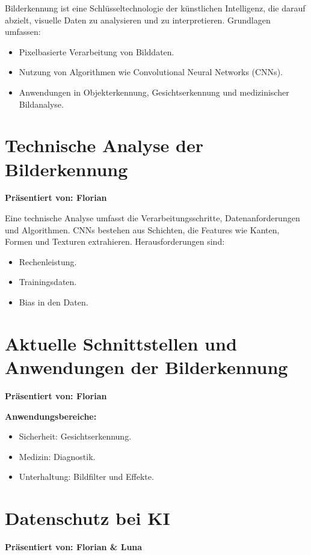 \documentclass[a4paper,12pt]{article}
\begin{document}
Bilderkennung ist eine Schlüsseltechnologie der künstlichen Intelligenz, die darauf abzielt, visuelle Daten zu analysieren und zu interpretieren. Grundlagen umfassen:
\begin{itemize}
    \item Pixelbasierte Verarbeitung von Bilddaten.
    \item Nutzung von Algorithmen wie Convolutional Neural Networks (CNNs).
    \item Anwendungen in Objekterkennung, Gesichtserkennung und medizinischer Bildanalyse.
\end{itemize}

\section{Technische Analyse der Bilderkennung}
\textbf{Präsentiert von: Florian}

Eine technische Analyse umfasst die Verarbeitungsschritte, Datenanforderungen und Algorithmen. CNNs bestehen aus Schichten, die Features wie Kanten, Formen und Texturen extrahieren. Herausforderungen sind:
\begin{itemize}
    \item Rechenleistung.
    \item Trainingsdaten.
    \item Bias in den Daten.
\end{itemize}

\section{Aktuelle Schnittstellen und Anwendungen der Bilderkennung}
\textbf{Präsentiert von: Florian}

\textbf{Anwendungsbereiche:}
\begin{itemize}
    \item Sicherheit: Gesichtserkennung.
    \item Medizin: Diagnostik.
    \item Unterhaltung: Bildfilter und Effekte.
\end{itemize}

\section{Datenschutz bei KI}
\textbf{Präsentiert von: Florian \& Luna}
\end{document}
